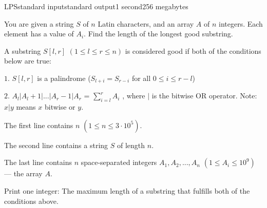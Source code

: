\begin{problem}{LPS}{standard input}{standard output}{1 second}{256 megabytes}

You are given a string $S$ of $n$ Latin characters, and an array $A$ of $n$ integers. Each element has a value of $A_i$. Find the length of the longest good substring.

A substring $S[l, r]$ $(1 ≤ l ≤ r ≤ n)$ is considered good if both of the conditions below are true:

$1.$ $S[l, r]$ is a palindrome ($S_{l+i} = S_{r−i}$ for all $0 ≤ i ≤ r − l$)


$2.$ $A_l
|A_l +1|...|A_r −1|A_r $ = $\sum_{i = l}^r A_i$
, where $|$ is the bitwise OR operator.
Note: $x|y$ means $x$ bitwise or $y$.

\InputFile
The first line contains $n$ $(1 ≤ n ≤ 3 \cdot 10^5)$.

The second line contains a string $S$ of length $n$.

The last line contains $n$ space-separated integers $A_1, A_2, ..., A_n$ $(1 ≤ A_i ≤ 10^9)$ --- the array $A$.

\OutputFile
Print one integer:
The maximum length of a substring that fulfills both of the conditions above.

\Examples

\begin{example}
%
%
%
\end{example}

\end{problem}

